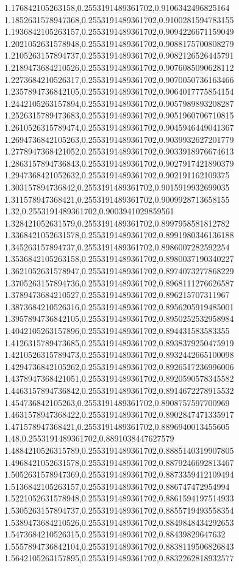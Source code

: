 1.176842105263158,0.2553191489361702,0.9106342496825164
1.1852631578947368,0.2553191489361702,0.9100281594783155
1.1936842105263157,0.2553191489361702,0.9094226671159049
1.2021052631578948,0.2553191489361702,0.9088175700808279
1.2105263157894737,0.2553191489361702,0.9082126526445791
1.2189473684210526,0.2553191489361702,0.9076085090628112
1.2273684210526317,0.2553191489361702,0.9070050736163466
1.2357894736842105,0.2553191489361702,0.9064017775854154
1.2442105263157894,0.2553191489361702,0.9057989893208287
1.2526315789473683,0.2553191489361702,0.9051960706710815
1.2610526315789474,0.2553191489361702,0.9045946449041367
1.2694736842105263,0.2553191489361702,0.9039932627201779
1.2778947368421052,0.2553191489361702,0.9033918976674613
1.2863157894736843,0.2553191489361702,0.9027917421890379
1.2947368421052632,0.2553191489361702,0.902191162109375
1.303157894736842,0.2553191489361702,0.9015919932699035
1.311578947368421,0.2553191489361702,0.9009928713658155
1.32,0.2553191489361702,0.9003941029859561
1.328421052631579,0.2553191489361702,0.8997958581812782
1.3368421052631578,0.2553191489361702,0.8991980346136188
1.345263157894737,0.2553191489361702,0.8986007282592254
1.3536842105263158,0.2553191489361702,0.8980037190340227
1.3621052631578947,0.2553191489361702,0.8974073277868229
1.3705263157894736,0.2553191489361702,0.8968111276626587
1.3789473684210527,0.2553191489361702,0.896215707311967
1.3873684210526316,0.2553191489361702,0.8956205919485001
1.3957894736842105,0.2553191489361702,0.8950252532958984
1.4042105263157896,0.2553191489361702,0.894431583583355
1.4126315789473685,0.2553191489361702,0.8938379250475919
1.4210526315789473,0.2553191489361702,0.8932442665100098
1.4294736842105262,0.2553191489361702,0.8926517236996006
1.4378947368421051,0.2553191489361702,0.8920590578345582
1.4463157894736842,0.2553191489361702,0.8914672278915532
1.454736842105263,0.2553191489361702,0.8908757597700969
1.4631578947368422,0.2553191489361702,0.8902847471335917
1.471578947368421,0.2553191489361702,0.8896940013455605
1.48,0.2553191489361702,0.8891038447627579
1.4884210526315789,0.2553191489361702,0.8885140319907805
1.4968421052631578,0.2553191489361702,0.8879246692813467
1.5052631578947369,0.2553191489361702,0.8873359412109494
1.5136842105263157,0.2553191489361702,0.886747472954994
1.5221052631578948,0.2553191489361702,0.8861594197514933
1.5305263157894737,0.2553191489361702,0.8855719493558354
1.5389473684210526,0.2553191489361702,0.8849848434292653
1.5473684210526315,0.2553191489361702,0.88439829647632
1.5557894736842104,0.2553191489361702,0.8838119506826843
1.5642105263157895,0.2553191489361702,0.8832262818932577
